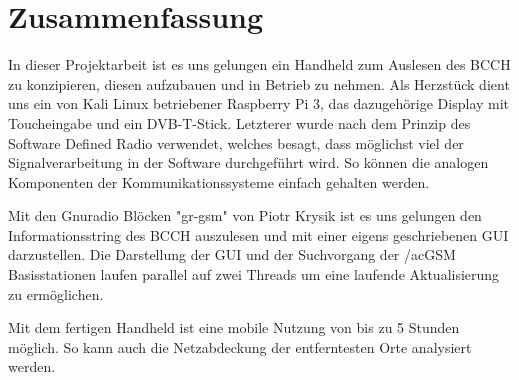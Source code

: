 %
%
\chapter{Zusammenfassung}

In dieser Projektarbeit ist es uns gelungen ein Handheld zum Auslesen des BCCH zu konzipieren, diesen aufzubauen und in Betrieb zu nehmen. Als Herzstück dient uns ein von Kali Linux betriebener Raspberry Pi 3, das dazugehörige Display mit Toucheingabe und ein DVB-T-Stick. Letzterer wurde nach dem Prinzip des Software Defined Radio verwendet, welches besagt, dass möglichst viel der Signalverarbeitung in der Software durchgeführt wird. So können die analogen Komponenten der Kommunikationssysteme einfach gehalten werden.

Mit den Gnuradio Blöcken "gr-gsm" von Piotr Krysik ist es uns gelungen den Informationsstring des BCCH auszulesen und mit einer eigens geschriebenen GUI darzustellen. Die Darstellung der GUI und der Suchvorgang der /ac{GSM} Basisstationen laufen parallel auf zwei Threads um eine laufende Aktualisierung zu ermöglichen.

Mit dem fertigen Handheld ist eine mobile Nutzung von bis zu 5 Stunden möglich. So kann auch die Netzabdeckung der entferntesten Orte analysiert werden.